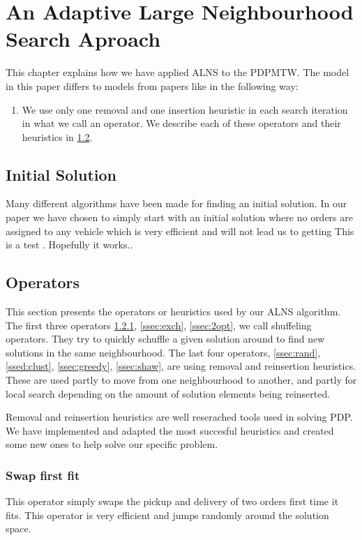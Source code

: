 \documentclass[../main.tex]{subfiles}
\begin{document}
                                                
\chapter{An Adaptive Large Neighbourhood Search Aproach}
\label{chap:4}
This chapter explains how we have applied ALNS to the PDPMTW. The model in this paper differs to models from papers like \cite{ropke06} in the following way:
\begin{enumerate}
    \item We use only one removal and one insertion heuristic in each search iteration in what we call an operator. We describe each of these operators and their heuristics in \ref{sec:oper}.
\end{enumerate}
\section{Initial Solution}
\label{sec:init}
Many different algorithms have been made for finding an initial solution. In our paper we have chosen to simply start with an initial solution where no orders are assigned to any vehicle which is very efficient and will not lead us to getting 
This is a test \cite{shaw97}. Hopefully it works..              

\section{Operators}
\label{sec:oper}
This section presents the operators or heuristics used by our ALNS algorithm.
The first three operators \ref{ssec:swap}, \ref{ssec:exch}, \ref{ssec:2opt}, we call shuffeling operators. They try to quickly schuffle a given solution around to find new solutions in the same neighbourhood.
The last four operators, \ref{ssec:rand}, \ref{ssed:clust}, \ref{ssec:greedy}, \ref{ssec:shaw}, are using removal and reinsertion heuristics. These are used partly to move from one neighbourhood to another, and partly for local search depending on the  amount of solution elements being reinserted.  

Removal and reinsertion heuristics are well reserached tools used in solving PDP. 
We have implemented and adapted the most succesful heuristics and created some new ones to help solve our specific problem. 

\subsection{Swap first fit}
\label{ssec:swap}
This operator simply swaps the pickup and delivery of two orders first time it fits. 
This operator is very efficient and jumps randomly around the solution space.
\end{document}
